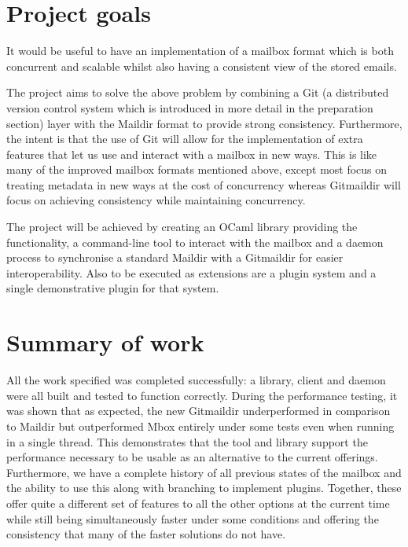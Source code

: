 \section{Project goals}

It would be useful to have an implementation of a mailbox format which is both concurrent and scalable whilst also having a consistent view of the stored emails.

The project aims to solve the above problem by combining a Git (a distributed version control system which is introduced in more detail in the preparation section) layer with the Maildir format to provide strong consistency. Furthermore, the intent is that the use of Git will allow for the implementation of extra features that let us use and interact with a mailbox in new ways. This is like many of the improved mailbox formats mentioned above, except most focus on treating metadata in new ways at the cost of concurrency whereas Gitmaildir will focus on achieving consistency while maintaining concurrency.

The project will be achieved by creating an OCaml library providing the functionality, a command-line tool to interact with the mailbox and a daemon process to synchronise a standard Maildir with a Gitmaildir for easier interoperability. Also to be executed as extensions are a plugin system and a single demonstrative plugin for that system.

\section{Summary of work}

All the work specified was completed successfully: a library, client and daemon were all built and tested to function correctly. During the performance testing, it was shown that as expected, the new Gitmaildir underperformed in comparison to Maildir but outperformed Mbox entirely under some tests even when running in a single thread. This demonstrates that the tool and library support the performance necessary to be usable as an alternative to the current offerings. Furthermore, we have a complete history of all previous states of the mailbox and the ability to use this along with branching to implement plugins. Together, these offer quite a different set of features to all the other options at the current time while still being simultaneously faster under some conditions and offering the consistency that many of the faster solutions do not have.

